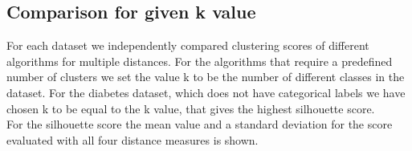 \subsection{Comparison for given k value}
For each dataset we independently compared clustering scores of different algorithms for multiple distances. For the algorithms that require a predefined number of clusters we set the value k to be the number of different classes in the dataset. For the diabetes dataset, which does not have categorical labels we have chosen k to be equal to the k value, that gives the highest silhouette score. \\
For the silhouette score the mean value and a standard deviation for the score evaluated with all four distance measures is shown. 

\begin{figure}[H]
	\centering
	\qquad
	\qquad
	\qquad

\end{figure}
